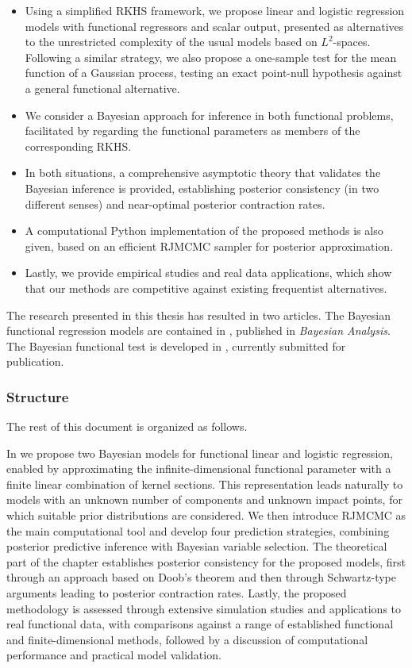 \begin{itemize}
  \item Using a simplified \acs{RKHS} framework, we propose linear and logistic regression models with functional regressors and scalar output, presented as alternatives to the unrestricted complexity of the usual models based on \(L^2\)-spaces. Following a similar strategy, we also propose a one-sample test for the mean function of a Gaussian process, testing an exact point-null hypothesis against a general functional alternative.
  \item We consider a Bayesian approach for inference in both functional problems, facilitated by regarding the functional parameters as members of the corresponding \acs{RKHS}.
  \item In both situations, a comprehensive asymptotic theory that validates the Bayesian inference is provided, establishing posterior consistency (in two different senses) and near-optimal posterior contraction rates.
  \item A computational Python implementation of the proposed methods is also given, based on an efficient \acs{RJMCMC} sampler for posterior approximation.
  \item Lastly, we provide empirical studies and real data applications, which show that our methods are competitive against existing frequentist alternatives.
\end{itemize}

The research presented in this thesis has resulted in two articles. The Bayesian functional regression models are contained in \citet{berrendero2025bayesian}, published in \textit{Bayesian Analysis}. The Bayesian functional test is developed in \citet{berrendero2026bayesian}, currently submitted for publication.

\subsubsection*{Structure}

The rest of this document is organized as follows.

In  we propose two Bayesian models for functional linear and logistic regression, enabled by approximating the infinite-dimensional functional parameter with a finite linear combination of kernel sections. This representation leads naturally to models with an unknown number of components and unknown impact points, for which suitable prior distributions are considered. We then introduce \acs{RJMCMC} as the main computational tool and develop four prediction strategies, combining posterior predictive inference with Bayesian variable selection. The theoretical part of the chapter establishes posterior consistency for the proposed models, first through an approach based on Doob's theorem and then through Schwartz-type arguments leading to posterior contraction rates. Lastly, the proposed methodology is assessed through extensive simulation studies and applications to real functional data, with comparisons against a range of established functional and finite-dimensional methods, followed by a discussion of computational performance and practical model validation.

